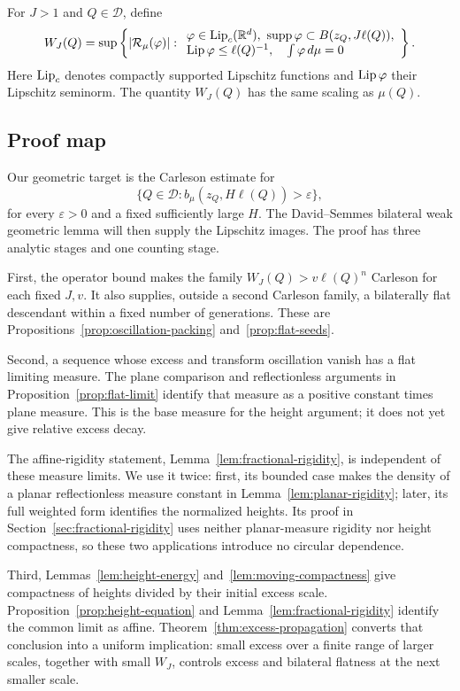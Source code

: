 For $J>1$ and $Q\in\mathcal D$, define
\begin{equation}\label{eq:oscillation-definition}
 W_J(Q)=\sup\left\{|\mathcal R_\mu(\varphi)|:
 \begin{array}{l}
 \varphi\in\operatorname{Lip}_c(\mathbb R^d),\ \operatorname{supp}\varphi\subset B(z_Q,J\ell(Q)),\\
 \operatorname{Lip}\varphi\le\ell(Q)^{-1},\quad\int\varphi\,d\mu=0
 \end{array}\right\}.
\end{equation}
Here $\operatorname{Lip}_c$ denotes compactly supported Lipschitz functions and
$\operatorname{Lip}\varphi$ their Lipschitz seminorm. The quantity $W_J(Q)$ has
the same scaling as $\mu(Q)$.

\subsection{Proof map}

Our geometric target is the Carleson estimate for
\[
 \{Q\in\mathcal D:b_\mu(z_Q,H\ell(Q))>\varepsilon\},
\]
for every $\varepsilon>0$ and a fixed sufficiently large $H$.
The David--Semmes bilateral weak geometric lemma will then supply
the Lipschitz images. The proof has three analytic stages and
one counting stage.

First, the operator bound makes the family
$W_J(Q)>v\ell(Q)^n$ Carleson for each fixed $J,v$.
It also supplies, outside a second Carleson family, a bilaterally flat
descendant within a fixed number of generations. These are
Propositions~\ref{prop:oscillation-packing} and~\ref{prop:flat-seeds}.

Second, a sequence whose excess and transform oscillation vanish has
a flat limiting measure. The plane comparison and reflectionless
arguments in Proposition~\ref{prop:flat-limit} identify that measure
as a positive constant times plane measure. This is the base measure
for the height argument; it does not yet give relative excess decay.

The affine-rigidity statement, Lemma~\ref{lem:fractional-rigidity}, is
independent of these measure limits. We use it twice: first, its bounded
case makes the density of a planar reflectionless measure constant in
Lemma~\ref{lem:planar-rigidity}; later, its full weighted form identifies
the normalized heights. Its proof in
Section~\ref{sec:fractional-rigidity} uses neither planar-measure rigidity
nor height compactness, so these two applications introduce no circular
dependence.

Third, Lemmas~\ref{lem:height-energy} and~\ref{lem:moving-compactness}
give compactness of heights divided by their initial excess scale.
Proposition~\ref{prop:height-equation} and
Lemma~\ref{lem:fractional-rigidity} identify the common limit as
affine. Theorem~\ref{thm:excess-propagation} converts that conclusion
into a uniform implication: small excess over a finite range of
larger scales, together with small $W_J$, controls excess and
bilateral flatness at the next smaller scale.

